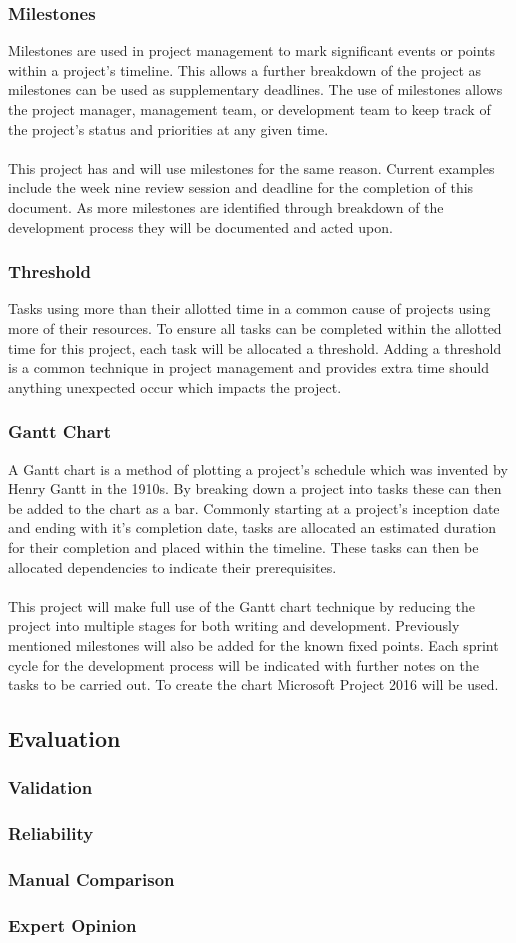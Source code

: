 	\subsubsection{Milestones}
		Milestones are used in project management to mark significant events or points within a project's timeline. This allows a further breakdown of the project as milestones can be used as supplementary deadlines. The use of milestones allows the project manager, management team, or development team to keep track of the project's status and priorities at any given time.
		\\\\
		This project has and will use milestones for the same reason. Current examples include the week nine review session and deadline for the completion of this document. As more milestones are identified through breakdown of the development process they will be documented and acted upon.
	\subsubsection{Threshold}
		Tasks using more than their allotted time in a common cause of projects using more of their resources. To ensure all tasks can be completed within the allotted time for this project, each task will be allocated a threshold. Adding a threshold is a common technique in project management and provides extra time should anything unexpected occur which impacts the project.
	\subsubsection{Gantt Chart}
		A Gantt chart is a method of plotting a project's schedule which was invented by Henry Gantt in the 1910s. By breaking down a project into tasks these can then be added to the chart as a bar. Commonly starting at a project's inception date and ending with it's completion date, tasks are allocated an estimated duration for their completion and placed within the timeline. These tasks can then be allocated dependencies to indicate their prerequisites.
		\\\\
		This project will make full use of the Gantt chart technique by reducing the project into multiple stages for both writing and development. Previously mentioned milestones will also be added for the known fixed points. Each sprint cycle for the development process will be indicated with further notes on the tasks to be carried out. To create the chart Microsoft Project 2016 will be used.
\subsection{Evaluation}
	\subsubsection{Validation}
	\subsubsection{Reliability}
	\subsubsection{Manual Comparison}
	\subsubsection{Expert Opinion}
